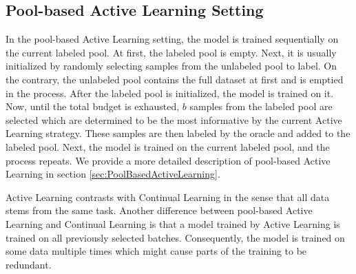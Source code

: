 \subsection{Pool-based Active Learning Setting}
\label{sec:Methodology:ALSetting}
In the pool-based Active Learning setting, the model is trained sequentially on the current labeled pool. At first, the labeled pool is empty. Next, it is usually
initialized by randomly selecting samples from the unlabeled pool to label. On the contrary, the unlabeled pool contains the full dataset at first and is emptied in the process.
After the labeled pool is initialized, the model is trained on it. Now, until the total budget is exhausted, $b$ samples from the labeled pool are selected which
are determined to be the most informative by the current Active Learning strategy. These samples are then labeled by the oracle and added to the labeled pool. Next, the
model is trained on the current labeled pool, and the process repeats. We provide a more detailed description of pool-based Active Learning in section \ref{sec:PoolBasedActiveLearning}. \par
Active Learning contrasts with Continual Learning in the sense that all data stems from the same task. Another difference between pool-based Active Learning and Continual
Learning is that a model trained by Active Learning is trained on all previously selected batches. Consequently, the model is trained on some data multiple times which
might cause parts of the training to be redundant.

